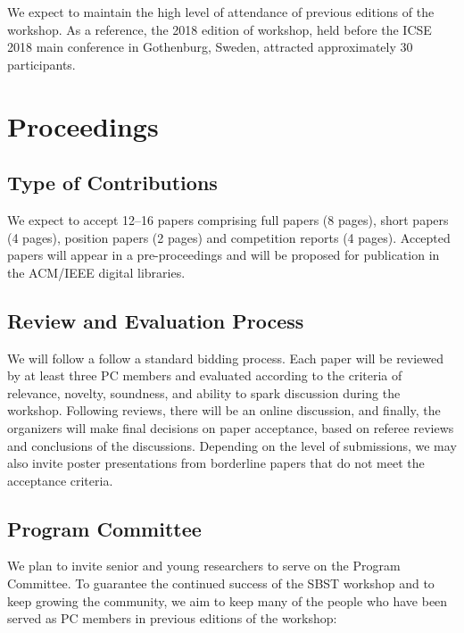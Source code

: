 \documentclass[sigconf,review]{acmart}
\begin{document}
We expect to maintain the high level of attendance of previous
editions of the workshop. As a reference, the 2018 edition of
workshop, held before the ICSE 2018 main conference in Gothenburg,
Sweden, attracted approximately 30 participants.

\section{Proceedings}

\subsection{Type of Contributions}

We expect to accept 12--16 papers comprising full papers (8 pages),
short papers (4 pages), position papers (2 pages) and competition
reports (4 pages).  Accepted papers will appear in a pre-proceedings
and will be proposed for publication in the ACM/IEEE digital
libraries.

\subsection{Review and Evaluation Process}

We will follow a follow a standard bidding process. Each paper will be
reviewed by at least three PC members and evaluated according to the
criteria of relevance, novelty, soundness, and ability to spark
discussion during the workshop. Following reviews, there will be an
online discussion, and finally, the organizers will make final
decisions on paper acceptance, based on referee reviews and
conclusions of the discussions. Depending on the level of submissions,
we may also invite poster presentations from borderline papers that do
not meet the acceptance criteria.


\subsection{Program Committee}

We plan to invite senior and young researchers to serve on the Program
Committee. To guarantee the continued success of the SBST workshop and
to keep growing the community, we aim to keep many of the people who
have been served as PC members in previous editions of the workshop:
\end{document}
